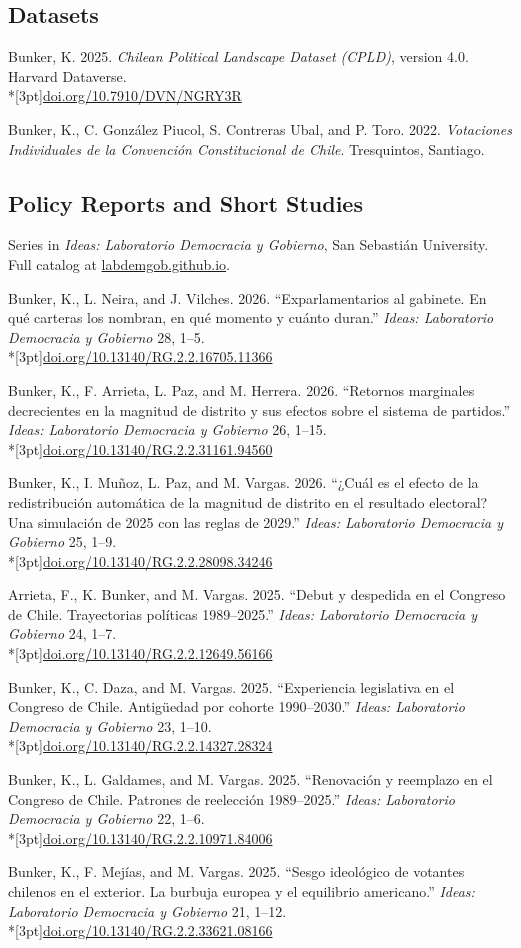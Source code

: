 \documentclass[11pt,letterpaper]{article}
\newif\ifafterhead
\newlength{\entrygap}\setlength{\entrygap}{8.5pt}
\newcommand{\gap}{\ifafterhead\global\afterheadfalse\else\vspace{\entrygap}\fi}
\newcommand{\entry}[1]{\par\gap\hangindent=13pt\hangafter=1\noindent #1\par}
\newcommand{\doi}[1]{\\*[3pt]{\small\href{https://doi.org/#1}{doi.org/#1}}}
\newcommand{\ideas}{\textit{Ideas: Laboratorio Democracia y Gobierno}}
\begin{document}
\subsection{Datasets}
\entry{Bunker, K. 2025. \textit{Chilean Political Landscape Dataset (CPLD)}, version 4.0. Harvard Dataverse.\doi{10.7910/DVN/NGRY3R}}

\entry{Bunker, K., C. González Piucol, S. Contreras Ubal, and P. Toro. 2022. \textit{Votaciones Individuales de la Convención Constitucional de Chile}. Tresquintos, Santiago.}

\subsection{Policy Reports and Short Studies}
Series in \ideas, San Sebastián University. Full catalog at \href{https://labdemgob.github.io/}{labdemgob.github.io}.\par\global\afterheadfalse

\entry{Bunker, K., L. Neira, and J. Vilches. 2026. ``Exparlamentarios al gabinete. En qué carteras los nombran, en qué momento y cuánto duran.'' \ideas{} 28, 1--5.\doi{10.13140/RG.2.2.16705.11366}}

\entry{Bunker, K., F. Arrieta, L. Paz, and M. Herrera. 2026. ``Retornos marginales decrecientes en la magnitud de distrito y sus efectos sobre el sistema de partidos.'' \ideas{} 26, 1--15.\doi{10.13140/RG.2.2.31161.94560}}

\entry{Bunker, K., I. Muñoz, L. Paz, and M. Vargas. 2026. ``¿Cuál es el efecto de la redistribución automática de la magnitud de distrito en el resultado electoral? Una simulación de 2025 con las reglas de 2029.'' \ideas{} 25, 1--9.\doi{10.13140/RG.2.2.28098.34246}}

\entry{Arrieta, F., K. Bunker, and M. Vargas. 2025. ``Debut y despedida en el Congreso de Chile. Trayectorias políticas 1989--2025.'' \ideas{} 24, 1--7.\doi{10.13140/RG.2.2.12649.56166}}

\entry{Bunker, K., C. Daza, and M. Vargas. 2025. ``Experiencia legislativa en el Congreso de Chile. Antigüedad por cohorte 1990--2030.'' \ideas{} 23, 1--10.\doi{10.13140/RG.2.2.14327.28324}}

\entry{Bunker, K., L. Galdames, and M. Vargas. 2025. ``Renovación y reemplazo en el Congreso de Chile. Patrones de reelección 1989--2025.'' \ideas{} 22, 1--6.\doi{10.13140/RG.2.2.10971.84006}}

\entry{Bunker, K., F. Mejías, and M. Vargas. 2025. ``Sesgo ideológico de votantes chilenos en el exterior. La burbuja europea y el equilibrio americano.'' \ideas{} 21, 1--12.\doi{10.13140/RG.2.2.33621.08166}}
\end{document}
